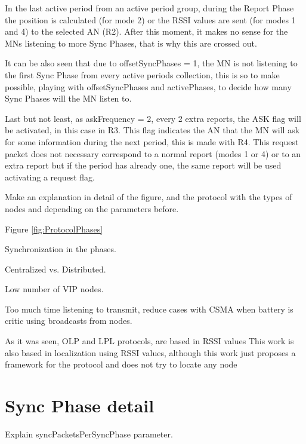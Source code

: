 In the last active period from an active period group, during the Report Phase the position is calculated (for mode 2) or the \ac{RSSI} 
values are sent (for modes 1 and 4) to the selected \ac{AN} (R2). After this moment, it makes no sense for the \acp{MN} listening to more
Sync Phases, that is why this are crossed out.

It can be also seen that due to offsetSyncPhases = 1, the \ac{MN} is not listening to the first Sync Phase from every active periods 
collection, this is so to make possible, playing with offsetSyncPhases and activePhases, to decide how many Sync Phases will the \ac{MN}
listen to.

Last but not least, as askFrequency = 2, every 2 extra reports, the ASK flag will be activated, in this case in R3. This flag indicates the 
\ac{AN} that the \ac{MN} will ask for some information during the next period, this is made with R4. This request packet does not necessary correspond
to a normal report (modes 1 or 4) or to an extra report but if the period has already one, the same report will be used activating a request
flag.

Make an explanation in detail of the figure, and the protocol with the types of nodes and depending on the parameters before.

Figure \ref{fig:ProtocolPhases} 




Synchronization in the phases.

Centralized vs. Distributed.

Low number of VIP nodes.

Too much time listening to transmit, reduce cases with CSMA when battery is critic using broadcasts from nodes.

As it was seen, \ac{OLP} and \ac{LPL} protocols, are based in \ac{RSSI} values
This work is also based in localization using \ac{RSSI} values, although this work just proposes a framework for the protocol and does not try 
to locate any
node 


\section{Sync Phase detail}

Explain syncPacketsPerSyncPhase parameter.
